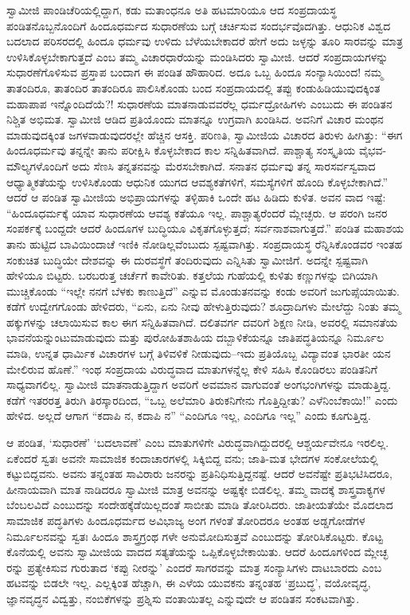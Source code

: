 ಸ್ವಾಮೀಜಿ ಪಾಂಡಿಚೆರಿಯಲ್ಲಿದ್ದಾಗ, ಕಡು ಮತಾಂಧನೂ ಅತಿ ಹಟಮಾರಿಯೂ ಆದ ಸಂಪ್ರದಾಯಸ್ಥ ಪಂಡಿತನೊಬ್ಬನೊಂದಿಗೆ ಹಿಂದೂಧರ್ಮದ ಸುಧಾರಣೆಯ ಬಗ್ಗೆ ಚರ್ಚಿಸುವ ಸಂದರ್ಭವೊದಗಿತ್ತು. ಆಧುನಿಕ ವಿಶ್ವದ ಬದಲಾದ ಪರಿಸರದಲ್ಲಿ ಹಿಂದೂ ಧರ್ಮವು ಉಳಿದು ಬೆಳೆಯಬೇಕಾದರೆ ಹೇಗೆ ಅದು ಜಳ್ಳನ್ನು ತೂರಿ ಸಾರವನ್ನು ಮಾತ್ರ ಉಳಿಸಿಕೊಳ್ಳಬೇಕಾಗುತ್ತದೆ ಎಂಬ ತಮ್ಮ ವಿಚಾರಧಾರೆಯನ್ನು ಮಂಡಿಸಿದರು ಸ್ವಾಮೀಜಿ. ಆದರೆ ಸಂಪ್ರದಾಯಗಳನ್ನು ಸುಧಾರಣೆಗೊಳಿಸುವ ಪ್ರಸ್ತಾಪ ಬಂದಾಗ ಈ ಪಂಡಿತ ಹೌಹಾರಿದ. ಅದೂ ಒಬ್ಬ ಹಿಂದೂ ಸಂನ್ಯಾಸಿಯಿಂದ! ನಮ್ಮ ತಾತಂದಿರೂ, ತಾತಂದಿರ ತಾತಂದಿರೂ ಪಾಲಿಸಿಕೊಂಡು ಬಂದ ಸಂಪ್ರದಾಯದಲ್ಲಿ ತಪ್ಪು ಕಂಡುಹಿಡಿಯುವುದಕ್ಕಿಂತ ಮಹಾಪಾಪ ಇನ್ನೊಂದಿದೆಯೆ?! ಸುಧಾರಣೆಯ ಮಾತನಾಡುವವರೆಲ್ಲ ಧರ್ಮದ್ರೋಹಿಗಳು ಎಂಬುದು ಈ ಪಂಡಿತನ ನಿಶ್ಚಿತ ಅಭಿಮತ. ಸ್ವಾಮೀಜಿ ಆಡಿದ ಪ್ರತಿಯೊಂದು ಮಾತನ್ನೂ ಉಗ್ರವಾಗಿ ಖಂಡಿಸಿದ. ಅವನಿಗೆ ವಿಚಾರ ಮಂಥನ ಮಾಡುವುದಕ್ಕಿಂತ ಜಗಳವಾಡುವುದರಲ್ಲೇ ಹೆಚ್ಚಿನ ಆಸಕ್ತಿ. ಪರಿಣತಿ, ಸ್ವಾಮೀಜಿಯ ವಿಚಾರದ ತಿರುಳು ಹೀಗಿತ್ತು: “ಈಗ ಹಿಂದೂಧರ್ಮವು ತನ್ನನ್ನೇ ತಾನು ಪರೀಕ್ಷಿಸಿ ಕೊಳ್ಳಬೇಕಾದ ಕಾಲ ಸನ್ನಿಹಿತವಾಗಿದೆ. ಪಾಶ್ಚಾತ್ಯ ಸಂಸ್ಕೃತಿಯ ವೈಭವ-ಮೌಲ್ಯಗಳೊಂದಿಗೆ ಅದು ಸೆಣಸಿ ತನ್ನತನವನ್ನು ಮೆರಸಬೇಕಾಗಿದೆ. ಸನಾತನ ಧರ್ಮವು ತನ್ನ ಸಾರಸರ್ವಸ್ವವಾದ ಆಧ್ಯಾತ್ಮಿಕತೆಯನ್ನು ಉಳಿಸಿಕೊಂಡು ಆಧುನಿಕ ಯುಗದ ಆವಶ್ಯಕತೆಗಳಿಗೆ, ಸಮಸ್ಯೆಗಳಿಗೆ ಹೊಂದಿ ಕೊಳ್ಳಬೇಕಾಗಿದೆ.” ಆದರೆ ಆ ಪಂಡಿತ ಸ್ವಾಮೀಜಿಯ ಅಭಿಪ್ರಾಯಗಳನ್ನು ತಳ್ಳಿಹಾಕಿ ಒಂದೇ ಹಟ ಹಿಡಿದು ಕುಳಿತ. ಅವನ ವಾದ ಇಷ್ಟೆ: “ಹಿಂದೂಧರ್ಮಕ್ಕೆ ಯಾವ ಸುಧಾರಣೆಯ ಆವಶ್ಯ ಕತೆಯೂ ಇಲ್ಲ. ಪಾಶ್ಚಾತ್ಯರೆಂದರೆ ಮ್ಲೇಚ್ಛರು. ಆ ಪರಂಗಿ ಜನರ ಸಂಪರ್ಕಕ್ಕೆ ಬಂದ್ದದೇ ಆದರೆ ಹಿಂದೂಗಳ ಬುದ್ಧಿಯೂ ವಿಕೃತಗೊಳ್ಳುತ್ತದೆ; ಸರ್ವನಾಶವಾಗುತ್ತದೆ.” ಪಂಡಿತ ಮಹಾಶಯ ತಾನು ಹುಟ್ಟಿದ ಬಾವಿಯಿಂದಾಚೆ ಇಣಿಕಿ ನೋಡಿಲ್ಲವೆಂಬುದು ಸ್ಪಷ್ಟವಾಗಿತ್ತು. ಸಂಪ್ರದಾಯಸ್ಥ ರೆನ್ನಿಸಿಕೊಂಡವರ ಇಂತಹ ಸಂಕುಚಿತ ಬುದ್ಧಿಯೇ ದೇಶವನ್ನು ಈ ದುರವಸ್ಥೆಗೆ ತಂದಿರುವುದು ಎನ್ನಿಸಿತು ಸ್ವಾಮೀಜಿಗೆ. ಅದನ್ನೇ ಸ್ಪಷ್ಟವಾಗಿ ಹೇಳಿಯೂ ಬಿಟ್ಟರು. ಬರಬರುತ್ತ ಚರ್ಚೆಗೆ ಕಾವೇರಿತು. ಕತ್ತಲೆಯ ಗುಹೆಯಲ್ಲಿ ಕುಳಿತು ಕಣ್ಣುಗಳನ್ನು ಬಿಗಿಯಾಗಿ ಮುಚ್ಚಿಕೊಂಡು “ಇಲ್ಲೇ ನನಗೆ ಬೆಳಕು ಕಾಣುತ್ತಿದೆ” ಎನ್ನುವ ಮೊಂಡುತನವನ್ನು ಕಂಡು ಅವರಿಗೆ ಜುಗುಪ್ಸೆಯಾಯಿತು. ಕಡೆಗೆ ಉದ್ವೇಗಗೊಂಡು ಹೇಳಿದರು, “ಏನು, ಏನು ನೀವು ಹೇಳುತ್ತಿರುವುದು? ಶೂದ್ರಾದಿಗಳು ಮೇಲೆದ್ದು ನಿಂತು ತಮ್ಮ ಹಕ್ಕುಗಳನ್ನು ಚಲಾಯಿಸುವ ಕಾಲ ಈಗ ಸನ್ನಿಹಿತವಾಗಿದೆ. ದಲಿತವರ್ಗ ದವರಿಗೆ ಶಿಕ್ಷಣ ನೀಡಿ, ಅವರಲ್ಲಿ ಸಮಾನತೆಯ ಭಾವನೆಯನ್ನುಂಟುಮಾಡುವುದು ಮತ್ತು ಪುರೋಹಿತಶಾಹಿಯ ದಬ್ಬಾಳಿಕೆಯನ್ನೂ ಜಾತಿಪದ್ಧತಿಯನ್ನೂ ನಿರ್ಮೂಲ ಮಾಡಿ, ಉನ್ನತ ಧಾರ್ಮಿಕ ವಿಚಾರಗಳ ಬಗ್ಗೆ ತಿಳಿವಳಿಕೆ ನೀಡುವುದು–ಇದು ಪ್ರತಿಯೊಬ್ಬ ವಿದ್ಯಾವಂತ ಭಾರತೀ ಯನ ಮೇಲಿರುವ ಹೊಣೆ.” ಇಂಥ ಸಂಪ್ರದಾಯ ವಿರುದ್ಧವಾದ ಮಾತುಗಳನ್ನೆಲ್ಲ ಕೇಳಿ ಸಹಿಸಿ ಕೊಂಡಿರಲು ಪಂಡಿತನಿಗೆ ಸಾಧ್ಯವಾಗಲಿಲ್ಲ. ಸ್ವಾಮೀಜಿ ಮಾತನಾಡುತ್ತಿದ್ದಾಗ ಅವರಿಗೆ ಅವಮಾನ ವಾಗುವಂತೆ ಅಂಗಭಂಗಿಗಳನ್ನು ಮಾಡುತ್ತಿದ್ದ. ಕಡೆಗೆ ಇತರರತ್ತ ತಿರುಗಿ ತಿರಸ್ಕಾರದಿಂದ, “ಒಬ್ಬ ಅಲೆಮಾರಿ ತಿರುಕನಿಗೇನು ಗೊತ್ತಿದ್ದೀತು? ಎಳೆನಿಂಬೆಕಾಯಿ!” ಎಂದು ಹೇಳಿದ. ಅಲ್ಲದೆ ಆಗಾಗ “ಕದಾಪಿ ನ, ಕದಾಪಿ ನ” “ಎಂದಿಗೂ ಇಲ್ಲ, ಎಂದಿಗೂ ಇಲ್ಲ” ಎಂದು ಕೂಗುತ್ತಿದ್ದ.

ಆ ಪಂಡಿತ, ‘ಸುಧಾರಣೆ’ ‘ಬದಲಾವಣೆ’ ಎಂಬ ಮಾತುಗಳಿಗೇ ವಿರುದ್ಧವಾಗಿದ್ದುದರಲ್ಲಿ ಆಶ್ಚರ್ಯವೇನೂ ಇರಲಿಲ್ಲ. ಏಕೆಂದರೆ ಸ್ವತಃ ಅವನೇ ಸಾಮಾಜಿಕ ಕಂದಾಚಾರಗಳಲ್ಲಿ ಸಿಕ್ಕಿಬಿದ್ದ ವನು; ಜಾತಿ-ಮತ ಭೇದಗಳ ಸಂಕೋಲೆಯಲ್ಲಿ ಕಟ್ಟುಬಿದ್ದವನು. ಅವನು ತನ್ನಂತಹ ಸಾವಿರಾರು ಜನರನ್ನು ಪ್ರತಿನಿಧಿಸುತ್ತಿದ್ದನಷ್ಟೆ. ಆದರೆ ಅವನೆಷ್ಟೇ ಪ್ರತಿಭಟಿಸಿದರೂ, ಹೀನಾಯವಾಗಿ ಮಾತ ನಾಡಿದರೂ ಸ್ವಾಮೀಜಿ ಮಾತ್ರ ಅವನನ್ನು ಅಷ್ಟಕ್ಕೇ ಬಿಡಲಿಲ್ಲ. ತಮ್ಮ ವಾದಕ್ಕೆ ಶಾಸ್ತ್ರವಾಕ್ಯಗಳ ಬೆಂಬಲವಿದೆ ಎಂಬುದನ್ನು ಸಂದೇಹಕ್ಕೆಡೆಯಿಲ್ಲದಂತೆ ಸಾಬೀತು ಮಾಡಿ ತೋರಿಸಿದರು. ಜಾತೀಯತೆಯೇ ಮೊದಲಾದ ಸಾಮಾಜಿಕ ಪದ್ಧತಿಗಳು ಹಿಂದೂಧರ್ಮದ ಅವಿಭಾಜ್ಯ ಅಂಗ ಗಳಂತೆ ತೋರಿದರೂ ಅಂತಹ ಅಡ್ಡಗೋಡೆಗಳ ನಿರ್ಮೂಲನವನ್ನು ಸ್ವತಃ ಹಿಂದೂ ಶಾಸ್ತ್ರಗ್ರಂಥ ಗಳೇ ಅನುಮೋದಿಸುತ್ತವೆ ಎಂಬುದನ್ನು ತೋರಿಸಿಕೊಟ್ಟರು. ಕೊಟ್ಟ ಕೊನೆಯಲ್ಲಿ ಅವನು ಸ್ವಾಮೀಜಿಯ ವಾದದ ಸತ್ಯತೆಯನ್ನು ಒಪ್ಪಿಕೊಳ್ಳಬೇಕಾಯಿತು. ಆದರೆ ಹಿಂದೂಗಳಿಂದ ಮ್ಲೇಚ್ಛ ರನ್ನು ಪ್ರತ್ಯೇಕಿಸುವ ಗುರುತಾದ ‘ಕಪ್ಪು ನೀರನ್ನು’ ಎಂದರೆ ಸಾಗರವನ್ನು ಮಾತ್ರ ಸಂನ್ಯಾಸಿಗಳು ದಾಟಬಾರದು ಎಂಬ ಹಟವನ್ನು ಬಿಡಲೇ ಇಲ್ಲ. ಎಲ್ಲಕ್ಕಿಂತ ಹೆಚ್ಚಾಗಿ, ಈ ಎಳೆಯ ಯುವಕನು ತನ್ನಂತಹ ‘ಪ್ರಬುದ್ಧ’, ವಯೋವೃದ್ಧ, ಜ್ಞಾನವೃದ್ಧನ ವಿದ್ವತ್ತು, ನಂಬಿಕೆಗಳನ್ನು ಪ್ರಶ್ನಿಸು ವಂತಾಯಿತಲ್ಲ ಎನ್ನುವುದೇ ಆ ಪಂಡಿತನ ಸಂಕಟವಾಗಿತ್ತು.

